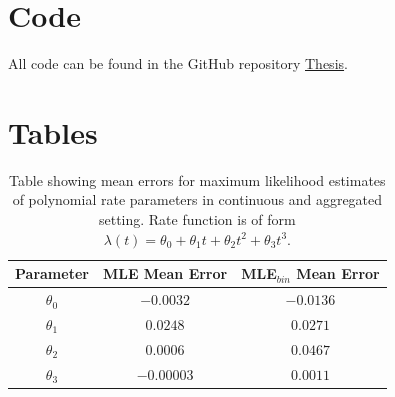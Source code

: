 \documentclass[11pt,a4,twosided,singlespacing,titlepagenumber=on,numbers=endperiod]{scrreprt}
\numberwithin{equation}{chapter} %
\theoremstyle{remark}
\begin{document}
\cleardoublepage
{}
{} %


\appendix %

\chapter{Code}
All code can be found in the GitHub repository \href{https://github.com/Tom-Crow/thesis}{Thesis}.
\begingroup
\let\clearpage\relax
\chapter{Tables}
\begin{table}[ht]
	\centering
	\begin{tabular}{|c|c|c|}
	\hline
		Parameter & MLE Mean Error & MLE$_{bin}$ Mean Error \\
	\hline
		$\theta_0$ & $-0.0032$ & $-0.0136$ \\
	\hline
		$\theta_1$  & $0.0248$ & $0.0271$ \\
	\hline
		$\theta_2$  & $0.0006$ & $0.0467$ \\
	\hline
		$\theta_3$  & $-0.00003$ & $0.0011$ \\
	\hline
	\end{tabular}
	\caption{Table showing mean errors for maximum likelihood estimates of polynomial rate parameters in continuous and aggregated setting. Rate function is of form $\lambda(t) = \theta_0 + \theta_1 t + \theta_2 t^2 + \theta_3 t^3.$}
	\label{tab:nhpp_poly_err}
\end{table}
\end{document}
